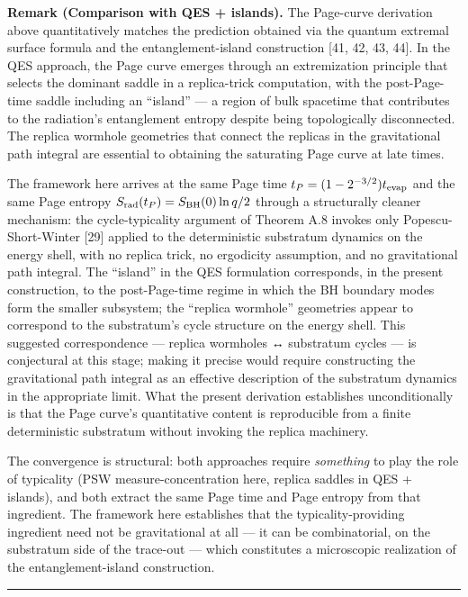 \documentclass[
]{article}
\begin{document}
\textbf{Remark (Comparison with QES + islands).} The Page-curve
derivation above quantitatively matches the prediction obtained via the
quantum extremal surface formula and the entanglement-island
construction {[}41, 42, 43, 44{]}. In the QES approach, the Page curve
emerges through an extremization principle that selects the dominant
saddle in a replica-trick computation, with the post-Page-time saddle
including an ``island'' --- a region of bulk spacetime that contributes
to the radiation's entanglement entropy despite being topologically
disconnected. The replica wormhole geometries that connect the replicas
in the gravitational path integral are essential to obtaining the
saturating Page curve at late times.

The framework here arrives at the same Page time
\(t_P = (1 - 2^{-3/2}) t_{\rm evap}\) and the same Page entropy
\(S_{\rm rad}(t_P) = S_{\rm BH}(0)\ln q/2\) through a structurally
cleaner mechanism: the cycle-typicality argument of Theorem A.8 invokes
only Popescu-Short-Winter {[}29{]} applied to the deterministic
substratum dynamics on the energy shell, with no replica trick, no
ergodicity assumption, and no gravitational path integral. The
``island'' in the QES formulation corresponds, in the present
construction, to the post-Page-time regime in which the BH boundary
modes form the smaller subsystem; the ``replica wormhole'' geometries
appear to correspond to the substratum's cycle structure on the energy
shell. This suggested correspondence --- replica wormholes ↔ substratum
cycles --- is conjectural at this stage; making it precise would require
constructing the gravitational path integral as an effective description
of the substratum dynamics in the appropriate limit. What the present
derivation establishes unconditionally is that the Page curve's
quantitative content is reproducible from a finite deterministic
substratum without invoking the replica machinery.

The convergence is structural: both approaches require \emph{something}
to play the role of typicality (PSW measure-concentration here, replica
saddles in QES + islands), and both extract the same Page time and Page
entropy from that ingredient. The framework here establishes that the
typicality-providing ingredient need not be gravitational at all --- it
can be combinatorial, on the substratum side of the trace-out --- which
constitutes a microscopic realization of the entanglement-island
construction.

\begin{center}\rule{0.5\linewidth}{0.5pt}\end{center}
\end{document}

